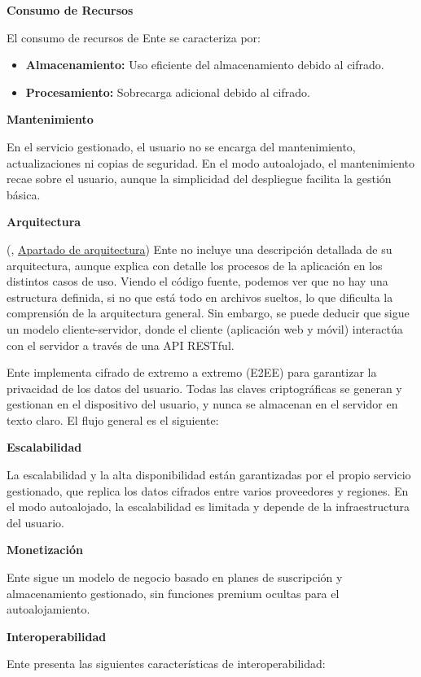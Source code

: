 \textbf{Consumo de Recursos}

El consumo de recursos de Ente se caracteriza por:

\begin{itemize}
    \item \textbf{Almacenamiento:} Uso eficiente del almacenamiento debido al cifrado.
    \item \textbf{Procesamiento:} Sobrecarga adicional debido al cifrado.
\end{itemize}

\textbf{Mantenimiento}

En el servicio gestionado, el usuario no se encarga del mantenimiento, actualizaciones ni copias de seguridad. En el modo autoalojado, el mantenimiento recae sobre el usuario, aunque la simplicidad del despliegue facilita la gestión básica.

\textbf{Arquitectura}

(\cite{ente-documentation}, \href{https://ente.io/architecture/}{Apartado de arquitectura}) Ente no incluye una descripción detallada de su arquitectura, aunque explica con detalle los procesos de la aplicación en los distintos casos de uso. Viendo el código fuente, podemos ver que no hay una estructura definida, si no que está todo en archivos sueltos, lo que dificulta la comprensión de la arquitectura general. Sin embargo, se puede deducir que sigue un modelo cliente-servidor, donde el cliente (aplicación web y móvil) interactúa con el servidor a través de una API RESTful.

Ente implementa cifrado de extremo a extremo (E2EE) para garantizar la privacidad de los datos del usuario. Todas las claves criptográficas se generan y gestionan en el dispositivo del usuario, y nunca se almacenan en el servidor en texto claro. El flujo general es el siguiente:

\textbf{Escalabilidad}

La escalabilidad y la alta disponibilidad están garantizadas por el propio servicio gestionado, que replica los datos cifrados entre varios proveedores y regiones. En el modo autoalojado, la escalabilidad es limitada y depende de la infraestructura del usuario.

\textbf{Monetización}

Ente sigue un modelo de negocio basado en planes de suscripción y almacenamiento gestionado, sin funciones premium ocultas para el autoalojamiento.

\textbf{Interoperabilidad}

Ente presenta las siguientes características de interoperabilidad:

